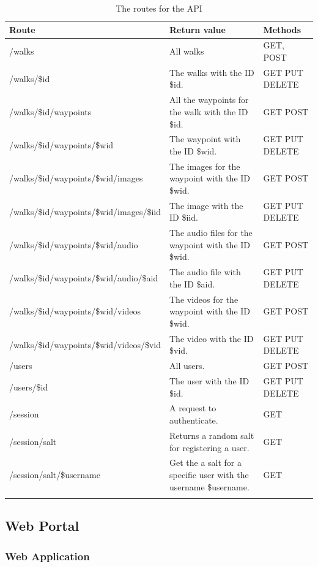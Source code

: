 \documentclass[11pt,a4paper]{article}
\begin{document}
\begin{longtable}{p{}|p{}|p{}}\hline
    \textbf{Route} & \textbf{Return value} & \textbf{Methods} \\\hline
    /walks & All walks & GET, POST\\ \hline
    /walks/\$id & The walks with the ID \$id. & GET PUT DELETE\\ \hline
    /walks/\$id/waypoints & All the waypoints for the walk with the ID \$id. & GET POST\\ \hline
    /walks/\$id/waypoints/\$wid & The waypoint with the ID \$wid. & GET PUT DELETE \\ \hline
    /walks/\$id/waypoints/\$wid/images & The images for the waypoint with the ID \$wid. & GET POST \\ \hline
    /walks/\$id/waypoints/\$wid/images/\$iid & The image with the ID \$iid. & GET PUT DELETE \\ \hline
    /walks/\$id/waypoints/\$wid/audio & The audio files for the waypoint with the ID \$wid. & GET POST \\ \hline
    /walks/\$id/waypoints/\$wid/audio/\$aid & The audio file with the ID \$aid. & GET PUT DELETE \\ \hline
    /walks/\$id/waypoints/\$wid/videos & The videos for the waypoint with the ID \$wid. & GET POST \\ \hline
    /walks/\$id/waypoints/\$wid/videos/\$vid & The video with the ID \$vid. & GET PUT DELETE \\ \hline
    /users & All users. & GET POST \\\hline
    /users/\$id & The user with the ID \$id. & GET PUT DELETE \\\hline
    /session & A request to authenticate. & GET\\\hline
    /session/salt & Returns a random salt for registering a user. & GET\\\hline
    /session/salt/\$username & Get the a salt for a specific user with the username \$username. & GET\\\hline
    \caption {The routes for the API}
    \label{routes}
\end{longtable}

\subsection{Web Portal}

\subsubsection{Web Application}
\end{document}
